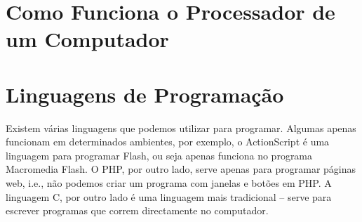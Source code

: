 %
%
%
%


\section{Como Funciona o Processador de um Computador}




\section{Linguagens de Programação}
Existem várias linguagens que podemos utilizar para programar. Algumas apenas funcionam em determinados ambientes, por exemplo, o ActionScript é uma linguagem para programar Flash, ou seja apenas funciona no programa Macromedia Flash.
O PHP, por outro lado, serve apenas para programar páginas web, i.e., não podemos criar um programa com janelas e botões em PHP.
A linguagem C, por outro lado é uma linguagem mais tradicional -- serve para escrever programas que correm directamente no computador.

